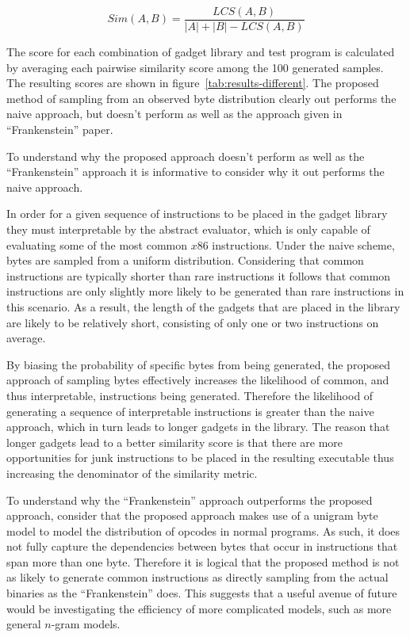     $$Sim(A,B) = \frac{LCS(A,B)}{|A| + |B| - LCS(A,B)}$$

    The score for each combination of gadget library and test program is
    calculated by averaging each pairwise similarity score among the 100
    generated samples. The resulting scores are shown in
    figure~\ref{tab:results-different}. The proposed method of sampling from an
    observed byte distribution clearly out performs the naive approach, but
    doesn't perform as well as the approach given in ``Frankenstein''
    paper\cite{franken}.

    To understand why the proposed approach doesn't perform as well as the
    ``Frankenstein'' approach it is informative to consider why it out performs
    the naive approach.
    
    In order for a given sequence of instructions to be placed in the gadget
    library they must interpretable by the abstract evaluator, which is only
    capable of evaluating some of the most common $x86$ instructions. Under the
    naive scheme, bytes are sampled from a uniform distribution. Considering
    that common instructions are typically shorter than rare instructions it
    follows that common instructions are only slightly more likely to be
    generated than rare instructions in this scenario. As a result, the length
    of the gadgets that are placed in the library are likely to be relatively
    short, consisting of only one or two instructions on average.

    By biasing the probability of specific bytes from being generated, the
    proposed approach of sampling bytes effectively increases the likelihood of
    common, and thus interpretable, instructions being generated. Therefore
    the likelihood of generating a sequence of interpretable instructions is
    greater than the naive approach, which in turn leads to longer gadgets in
    the library. The reason that longer gadgets lead to a better similarity
    score is that there are more opportunities for junk instructions to be
    placed in the resulting executable thus increasing the denominator of the
    similarity metric.
    
    To understand why the ``Frankenstein'' approach outperforms the proposed
    approach, consider that the proposed approach makes use of a unigram byte
    model to model the distribution of opcodes in normal programs. As such, it
    does not fully capture the dependencies between bytes that occur in
    instructions that span more than one byte. Therefore it is logical that the
    proposed method is not as likely to generate common instructions as directly
    sampling from the actual binaries as the ``Frankenstein'' does. This
    suggests that a useful avenue of future would be investigating the
    efficiency of more complicated models, such as more general $n$-gram models.

